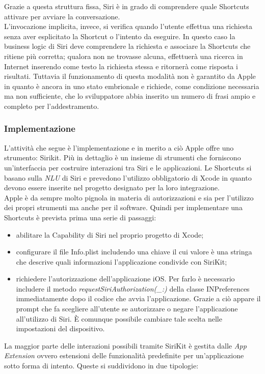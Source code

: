 		Grazie a questa struttura fissa, Siri è in grado di comprendere quale Shortcuts attivare per avviare la conversazione. \\
		L'invocazione implicita, invece, si verifica quando l'utente effettua una richiesta senza aver esplicitato la Shortcut o l'intento da eseguire. In questo caso la business logic di Siri deve comprendere la richiesta e associare la Shortcuts che ritiene più corretta; qualora non ne trovasse alcuna, effettuerà una ricerca in Internet inserendo come testo la richiesta stessa e ritornerà come risposta i risultati. Tuttavia il funzionamento di questa modalità non è garantito da Apple in quanto è ancora in uno stato embrionale e richiede, come condizione necessaria ma non sufficiente, che lo sviluppatore abbia inserito un numero di frasi ampio e completo per l'addestramento.
		\subsubsection{Implementazione}
		L'attività che segue è l'implementazione e in merito a ciò Apple offre uno strumento: Sirikit. Più in dettaglio è un insieme di strumenti che forniscono un'interfaccia per costruire interazioni tra Siri e le applicazioni. Le Shortcuts si basano sulla \textit{NLU} di Siri e prevedono l'utilizzo obbligatorio di Xcode in quanto devono essere inserite nel progetto designato per la loro integrazione. \\
		Apple è da sempre molto pignola in materia di autorizzazioni e sia per  l'utilizzo dei propri strumenti ma anche per il software. Quindi per implementare una Shortcuts è prevista prima una serie di passaggi:
		\begin{itemize}
			\item abilitare la Capability di Siri nel proprio progetto di Xcode;
			\item configurare il file Info.plist includendo una chiave il cui valore è una stringa che descrive quali informazioni l'applicazione condivide con SiriKit;
			\item richiedere l’autorizzazione dell’applicazione iOS. Per farlo è necessario includere il metodo \textit{requestSiriAuthorization(_:)} della classe INPreferences immediatamente dopo il codice che avvia l’applicazione. Grazie a ciò appare il prompt che fa scegliere all’utente se autorizzare o negare l’applicazione all’utilizzo di Siri. È comunque possibile cambiare tale scelta nelle impostazioni del dispositivo.
		\end{itemize}
		La maggior parte delle interazioni possibili tramite SiriKit è gestita dalle \textit{App Extension} ovvero estensioni delle funzionalità predefinite per un'applicazione sotto forma di intento. Queste si suddividono in due tipologie:
